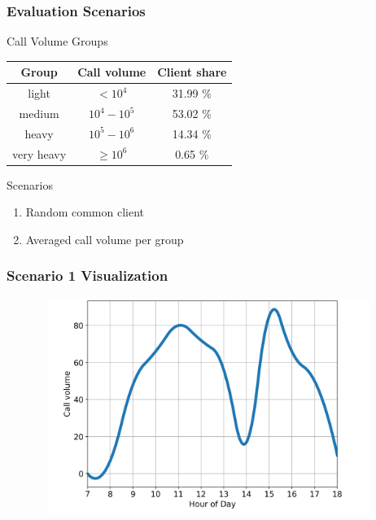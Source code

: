 \documentclass[11pt,t,usepdftitle=false,aspectratio=169]{beamer}
\begin{document}
\begin{frame}
	\frametitle{Evaluation Scenarios}
	
	\begin{alertblock}{Call Volume Groups}
		\begin{table}
			\begin{center}
				\begin{tabular}{|c c c|}
					\hline
					Group & Call volume & Client share \\
					\hline
					light & $< 10^4$ & 31.99 \% \\
					medium & $10^4 - 10^5$ & 53.02 \% \\
					heavy &  $10^5 - 10^6$ & 14.34 \% \\
					very heavy & $\ge 10^6$ & 0.65 \% \\
					\hline
				\end{tabular}
			\end{center}
		\end{table}
	\end{alertblock}
	
	\begin{block}{Scenarios}
		\begin{enumerate}
			\item Random common client
			\item Averaged call volume per group
		\end{enumerate}
	\end{block}
\end{frame}

\begin{frame}
	\frametitle{Scenario 1 Visualization}
	\begin{figure}
		\centering
		\vspace*{-0.25cm}
		\includegraphics[width=11cm,height=7cm]{_images/scenario_1/call_distribution_real.png}
	\end{figure}
\end{frame}
\end{document}
